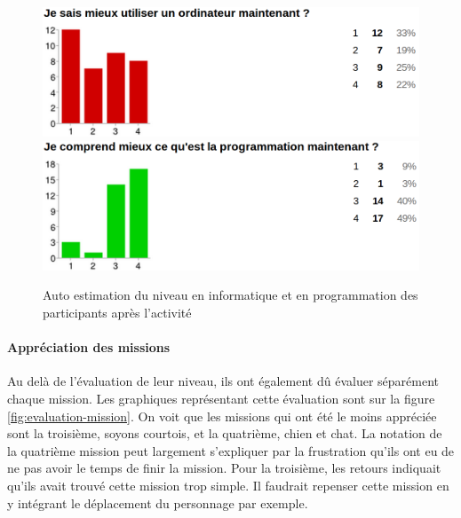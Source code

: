 \begin{figure}[ht]
  \begin{center}
    \includegraphics[scale=0.3]{content/8-validation/images/apres}
    \includegraphics[scale=0.3]{content/8-validation/images/apres-programmation}
    \caption{Auto estimation du niveau en informatique et en programmation des participants après l'activité}
    \label{fig:niveau-apres}
  \end{center}
\end{figure}

\paragraph{Appréciation des missions}
\label{appreciation}
Au delà de l'évaluation de leur niveau, ils ont également dû évaluer séparément chaque mission. Les graphiques représentant cette évaluation sont sur la figure \ref{fig:evaluation-mission}. On voit que les missions qui ont été le moins appréciée sont la troisième, soyons courtois, et la quatrième, chien et chat. La notation de la quatrième mission peut largement s'expliquer par la frustration qu'ils ont eu de ne pas avoir le temps de finir la mission. Pour la troisième, les retours indiquait qu'ils avait trouvé cette mission trop simple. Il faudrait repenser cette mission en y intégrant le déplacement du personnage par exemple.\\


